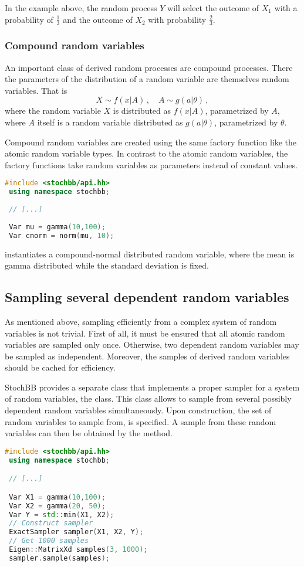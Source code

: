 In the example above, the random process $Y$ will select the outcome of $X_1$ with
a probability of $\frac{1}{3}$ and the outcome of $X_2$ with probability
$\frac{2}{3}$.

\subsubsection{Compound random variables}
An important class of derived random processes are compound processes. There the parameters of the
distribution of a random variable are themselves random variables. That is
\begin{equation}
 X \sim f(x|A)\,,\quad A \sim g(a|\theta)\,, \nonumber
\end{equation}
where the random variable $X$ is distributed as $f(x|A)$, parametrized by $A$,
where $A$ itself is a random variable distributed as $g(a|\theta)$, parametrized by
$\theta$. 

Compound random variables are created using the same factory function like the atomic random variable
types. In contrast to the atomic random variables, the factory functions take random variables as 
parameters instead of constant values.
\begin{lstlisting}[language=C++]
 #include <stochbb/api.hh>
 using namespace stochbb;
 
 // [...]
 
 Var mu = gamma(10,100);
 Var cnorm = norm(mu, 10);
\end{lstlisting}
instantiates a compound-normal distributed random variable, where the mean is gamma distributed
while the standard deviation is fixed.

\subsection{Sampling several dependent random variables}
As mentioned above, sampling efficiently from a complex system of random variables is not trivial. 
First of all, it must be ensured that all atomic random variables are sampled only once. Otherwise, two dependent
random variables may be sampled as independent. Moreover, the samples of derived random variables
should be cached for efficiency. 

StochBB provides a separate class that implements a proper sampler for a system
of random variables, the  class. This class allows to sample
from several possibly dependent random variables simultaneously. Upon construction,
the set of random variables to sample from, is specified. A sample from these random
variables can then be obtained by the  method.
\begin{lstlisting}[language=C++]
 #include <stochbb/api.hh>
 using namespace stochbb;

 // [...]

 Var X1 = gamma(10,100);
 Var X2 = gamma(20, 50);
 Var Y = std::min(X1, X2);
 // Construct sampler
 ExactSampler sampler(X1, X2, Y);
 // Get 1000 samples
 Eigen::MatrixXd samples(3, 1000);
 sampler.sample(samples);
\end{lstlisting}

